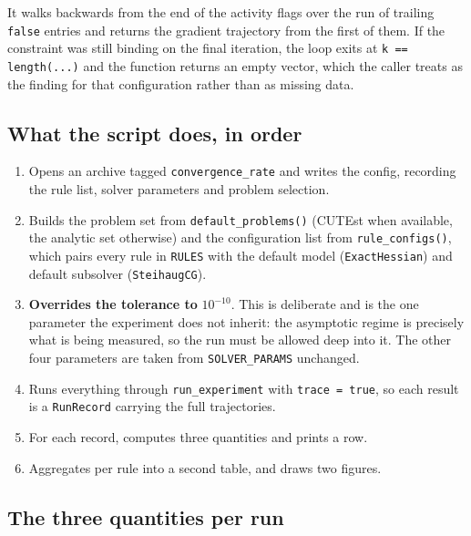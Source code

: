 \documentclass[11pt,a4paper]{article}
\newcommand{\jl}[1]{\texttt{\small #1}}
\begin{document}
It walks backwards from the end of the activity flags over the run of trailing
\jl{false} entries and returns the gradient trajectory from the first of them. If
the constraint was still binding on the final iteration, the loop exits at
\jl{k == length(...)} and the function returns an empty vector, which the caller
treats as the finding for that configuration rather than as missing data.

\subsection{What the script does, in order}

\begin{enumerate}[leftmargin=7mm,itemsep=3pt]
  \item Opens an archive tagged \jl{convergence\_rate} and writes the config,
        recording the rule list, solver parameters and problem selection.
  \item Builds the problem set from \jl{default\_problems()} (CUTEst when
        available, the analytic set otherwise) and the configuration list from
        \jl{rule\_configs()}, which pairs every rule in \jl{RULES} with the default
        model (\jl{ExactHessian}) and default subsolver (\jl{SteihaugCG}).
  \item \textbf{Overrides the tolerance to} $10^{-10}$. This is deliberate and is
        the one parameter the experiment does not inherit: the asymptotic regime is
        precisely what is being measured, so the run must be allowed deep into it.
        The other four parameters are taken from \jl{SOLVER\_PARAMS} unchanged.
  \item Runs everything through \jl{run\_experiment} with \jl{trace = true}, so each
        result is a \jl{RunRecord} carrying the full trajectories.
  \item For each record, computes three quantities and prints a row.
  \item Aggregates per rule into a second table, and draws two figures.
\end{enumerate}

\subsection{The three quantities per run}
\end{document}
